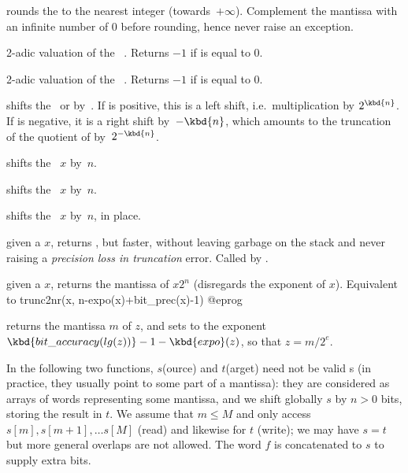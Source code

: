  rounds the   to the nearest
integer (towards~$+\infty$). Complement the mantissa with an infinite number
of $0$ before rounding, hence never raise an exception.


 2-adic valuation of the ~. Returns
$-1$ if  is equal to 0.

 2-adic valuation of the ~. Returns $-1$
if  is equal to 0.

 shifts the~ or
  by~. If  is positive, this is a left shift,
i.e.~multiplication by $2^{\kbd{n}}$. If  is negative, it is a right
shift by~$-\kbd{n}$, which amounts to the truncation of the quotient of 
by~$2^{-\kbd{n}}$.

 shifts the ~$x$ by~$n$.

 shifts the ~$x$ by~$n$.

 shifts the ~$x$ by~$n$,
in place.

 given a  $x$, returns
, but faster, without leaving garbage on the stack
and never raising a \emph{precision loss in truncation} error.
Called by .

 given a  $x$, returns
the mantissa of $x 2^n$ (disregards the exponent of $x$). Equivalent to
\bprog
  trunc2nr(x, n-expo(x)+bit_prec(x)-1)
@eprog

 returns the mantissa $m$ of $z$, and
sets  to the exponent $\kbd{bit\_accuracy(lg(z))}-1-\kbd{expo}(z)$,
so that $z = m / 2^e$.

 In the following two functions, $s$(ource) and $t$(arget)
need not be valid s (in practice, they usually point to some part of a
 mantissa): they are considered as arrays of words representing some
mantissa, and we shift globally $s$ by $n > 0$ bits, storing the result in
$t$. We assume that $m\leq M$ and only access $s[m], s[m+1],\ldots s[M]$
(read) and likewise for $t$ (write); we may have $s = t$ but more general
overlaps are not allowed. The word $f$ is concatenated to $s$ to supply extra
bits.

